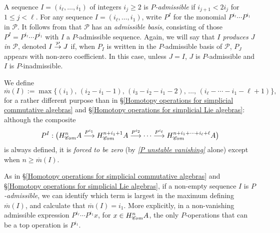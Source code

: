 \documentclass[11pt]{amsart} \renewcommand{\baselinestretch}{1.2}
\theoremstyle{plain}
\newtheorem{lem}[thm]{Lemma}
\numberwithin{equation}{section} %
\theoremstyle{plain}
\newtheorem{lem}[thm]{Lemma}
\numberwithin{equation}{chapter} %
\renewcommand{\to}{\longrightarrow}
\newcommand{\scrC}{\mathscr{C}}
\newcommand{\calP}{\mathcal{P}}
\newcommand{\Palg}{{\calP}}
\newcommand{\minDimP}{\overline{m}}
\newcommand{\minDimDelta}{m}
\newcommand{\produces}[3]{#3:#1\sim #2}
\renewcommand{\produces}[3]{#1\rightarrow_{#3} #2}%
\renewcommand{\produces}[3]{#1\overset{\smash{#3}}{\rightarrow} #2}%
\newcommand{\algs}{{\scrC\!\textit{\normalfont\textit{om}}}}
\begin{document}
\begin{Constructing cohomology operations}
A sequence $I=(i_\ell,\ldots,i_1)$ of integers $i_j\geq2$ is \emph{$P$-admissible} if $i_{j+1}<2i_j$ for $1\leq j <\ell$. For any sequence $I=(i_\ell,\ldots,i_1)$, write $P^I$ for the monomial $P^{i_\ell}\cdots P^{i_1}$ in $\Palg$. It follows from \cite[Theorem I]{MR1089001} that $\Palg$ has an \emph{admissible basis}, consisting of those $P^I=P^{i_\ell}\cdots P^{i_{1}}$ with $I$ a $P$-admissible sequence.  Again, we will say that \emph{$I$ produces $J$ in $\Palg$}, denoted $\produces{I}{J}{\Palg}$ if, when $P_I$ is written in the $P$-admissible basis of $\Palg$, $P_J$ appears with non-zero coefficient. In this case, unless $J=I$, $J$ is $P$-admissible and $I$ is $P$-inadmissible.

We define
\[\minDimP(I):=\max\{(i_1),\,(i_2-i_1-1),\,(i_3-i_2-i_1-2),\,\ldots,\,(i_{\ell}-\cdots-i_1-\ell+1)\},\]
for a rather different purpose than in \S\ref{Homotopy operations for simplicial commutative algebras} and \S\ref{Homotopy operations for simplicial Lie algebras}: although the composite 
\[P^I:\bigl(H_{\algs}^{n}A\overset{P^{i_1}}{\to}H_{\algs}^{n+i_1+1}A\overset{P^{i_2}}{\to}\cdots \overset{P^{i_\ell}}{\to}H_{\algs}^{n+i_1+\cdots +i_\ell+\ell}A\bigr)\]
is always defined, it is \emph{forced to be zero} (by \emph{\ref{P unstable vanishing}} alone) except  when $n\geq\minDimP(I)$.

As in \S\ref{Homotopy operations for simplicial commutative algebras} and \S\ref{Homotopy operations for simplicial Lie algebras}, if a non-empty sequence $I$  is \emph{$P$-admissible}, we can identify which term is largest in the maximum defining $\minDimP(I)$, and calculate that $\minDimP(I)=i_1$. More explicitly, in a non-vanishing admissible expression $P^{i_\ell}\cdots P^{i_1}x$, for $x\in H^n_{\algs}A$, the only $P$-operations that can be a top operation is $P^{i_{1}}$.




\end{Constructing cohomology operations}
\end{document}

